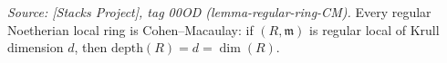 \begin{corollary}

  \label{cor:regular_cohen_macaulay}
  \textit{Source: [Stacks Project], tag 00OD (lemma-regular-ring-CM).}
  Every regular Noetherian local ring is Cohen--Macaulay: if \((R, \mathfrak{m})\) is
  regular local of Krull dimension \(d\), then \(\text{depth}(R) = d = \dim(R)\).
\end{corollary}

